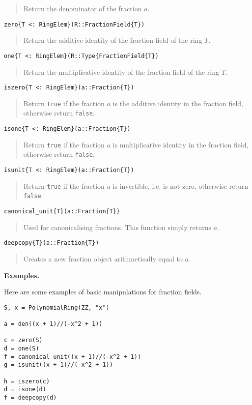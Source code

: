 \documentclass[a4paper,10pt]{article}
\newcommand{\code}{\lstinline}
\newcommand{\desc}[1]{\vspace{-3mm}\begin{quote}#1\end{quote}}
\begin{document}
\desc{Return the denominator of the fraction $a$.}

\begin{lstlisting}
zero{T <: RingElem}(R::FractionField{T})
\end{lstlisting}

\desc{Return the additive identity of the fraction field of the ring $T$.}

\begin{lstlisting}
one{T <: RingElem}(R::Type{FractionField{T})
\end{lstlisting}

\desc{Return the multiplicative identity of the fraction field of the ring 
$T$.}

\begin{lstlisting}
iszero{T <: RingElem}(a::Fraction{T})
\end{lstlisting}

\desc{Return \code{true} if the fraction $a$ is the additive identity in the
fraction field, otherwise return \code{false}.}

\begin{lstlisting}
isone{T <: RingElem}(a::Fraction{T})
\end{lstlisting}

\desc{Return \code{true} if the fraction $a$ is multiplicative identity in the
fraction field, otherwise return \code{false}.}

\begin{lstlisting}
isunit{T <: RingElem}(a::Fraction{T})
\end{lstlisting}

\desc{Return \code{true} if the fraction $a$ is invertible, i.e. is not zero,
otherwise return \code{false}.}

\begin{lstlisting}
canonical_unit{T}(a::Fraction{T})
\end{lstlisting}

\desc{Used for canonicalising fractions. This function simply returns $a$.}

\begin{lstlisting}
deepcopy{T}(a::Fraction{T})
\end{lstlisting}

\desc{Creates a new fraction object arithmetically equal to $a$.}

\textbf{Examples.}

Here are some examples of basic manipulations for fraction fields.

\begin{lstlisting}
S, x = PolynomialRing(ZZ, "x")

a = den((x + 1)//(-x^2 + 1))

c = zero(S)
d = one(S)
f = canonical_unit((x + 1)//(-x^2 + 1))
g = isunit((x + 1)//(-x^2 + 1))

h = iszero(c)
d = isone(d)
f = deepcopy(d)
\end{lstlisting}
\end{document}
